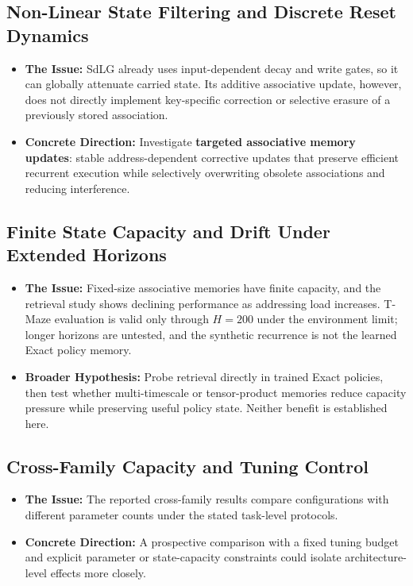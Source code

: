 \subsection{Non-Linear State Filtering and Discrete Reset Dynamics}
\begin{itemize}
    \item \textbf{The Issue:} SdLG already uses input-dependent decay and write gates, so it can globally attenuate carried state. Its additive associative update, however, does not directly implement key-specific correction or selective erasure of a previously stored association.
    \item \textbf{Concrete Direction:} Investigate \textbf{targeted associative memory updates}: stable address-dependent corrective updates that preserve efficient recurrent execution while selectively overwriting obsolete associations and reducing interference.
\end{itemize}

\subsection{Finite State Capacity and Drift Under Extended Horizons}
\begin{itemize}
    \item \textbf{The Issue:} Fixed-size associative memories have finite capacity, and the retrieval study shows declining performance as addressing load increases. T-Maze evaluation is valid only through $H=200$ under the environment limit; longer horizons are untested, and the synthetic recurrence is not the learned Exact policy memory.
    \item \textbf{Broader Hypothesis:} Probe retrieval directly in trained Exact policies, then test whether multi-timescale or tensor-product memories reduce capacity pressure while preserving useful policy state. Neither benefit is established here.
\end{itemize}

\subsection{Cross-Family Capacity and Tuning Control}
\begin{itemize}
    \item \textbf{The Issue:} The reported cross-family results compare configurations with different parameter counts under the stated task-level protocols.
    \item \textbf{Concrete Direction:} A prospective comparison with a fixed tuning budget and explicit parameter or state-capacity constraints could isolate architecture-level effects more closely.
\end{itemize}

